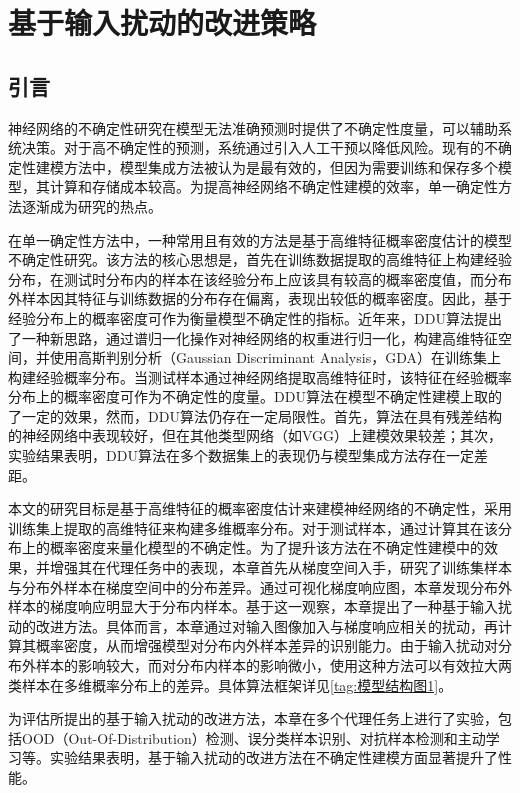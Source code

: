 \chapter{基于输入扰动的改进策略}


\section{引言}

神经网络的不确定性研究在模型无法准确预测时提供了不确定性度量，可以辅助系统决策。对于高不确定性的预测，系统通过引入人工干预以降低风险。现有的不确定性建模方法中，模型集成方法被认为是最有效的，但因为需要训练和保存多个模型，其计算和存储成本较高。为提高神经网络不确定性建模的效率，单一确定性方法逐渐成为研究的热点。 

在单一确定性方法中，一种常用且有效的方法是基于高维特征概率密度估计的模型不确定性研究。该方法的核心思想是，首先在训练数据提取的高维特征上构建经验分布，在测试时分布内的样本在该经验分布上应该具有较高的概率密度值，而分布外样本因其特征与训练数据的分布存在偏离，表现出较低的概率密度。因此，基于经验分布上的概率密度可作为衡量模型不确定性的指标。近年来，DDU\cite{Mukhoti_2023_CVPR}算法提出了一种新思路，通过谱归一化操作对神经网络的权重进行归一化，构建高维特征空间，并使用高斯判别分析（Gaussian Discriminant Analysis，GDA）在训练集上构建经验概率分布。当测试样本通过神经网络提取高维特征时，该特征在经验概率分布上的概率密度可作为不确定性的度量。DDU算法在模型不确定性建模上取的了一定的效果，然而，DDU算法仍存在一定局限性。首先，算法在具有残差结构的神经网络中表现较好，但在其他类型网络（如VGG）上建模效果较差；其次，实验结果表明，DDU算法在多个数据集上的表现仍与模型集成方法存在一定差距。

本文的研究目标是基于高维特征的概率密度估计来建模神经网络的不确定性，采用训练集上提取的高维特征来构建多维概率分布。对于测试样本，通过计算其在该分布上的概率密度来量化模型的不确定性。为了提升该方法在不确定性建模中的效果，并增强其在代理任务中的表现，本章首先从梯度空间入手，研究了训练集样本与分布外样本在梯度空间中的分布差异。通过可视化梯度响应图，本章发现分布外样本的梯度响应明显大于分布内样本。基于这一观察，本章提出了一种基于输入扰动的改进方法。具体而言，本章通过对输入图像加入与梯度响应相关的扰动，再计算其概率密度，从而增强模型对分布内外样本差异的识别能力。由于输入扰动对分布外样本的影响较大，而对分布内样本的影响微小，使用这种方法可以有效拉大两类样本在多维概率分布上的差异。具体算法框架详见\ref{tag:模型结构图1}。

为评估所提出的基于输入扰动的改进方法，本章在多个代理任务上进行了实验，包括OOD（Out-Of-Distribution）检测、误分类样本识别、对抗样本检测和主动学习等。实验结果表明，基于输入扰动的改进方法在不确定性建模方面显著提升了性能。

